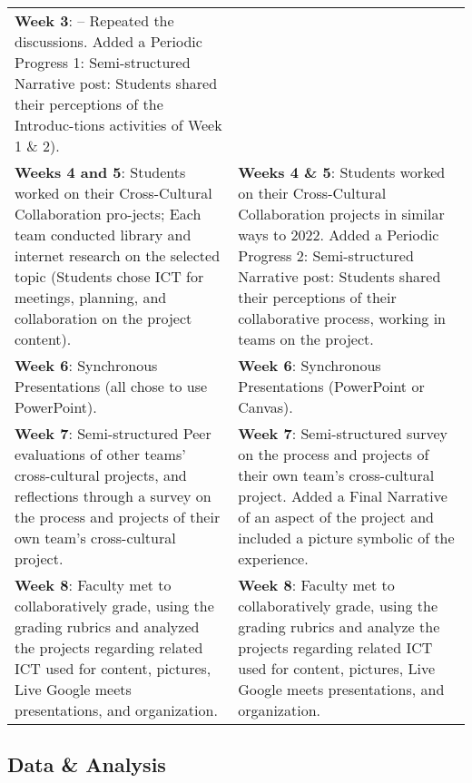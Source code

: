 \begin{table}[htpb]
\begin{threeparttable}
\begin{tabular}{*{2}{p{}}}
\textbf{Week 3}: – Repeated the discussions.
Added a Periodic Progress 1: Semi-structured Narrative post: Students shared their perceptions of the Introduc-tions activities of Week 1 \& 2). \\
										
\textbf{Weeks 4 and 5}: Students worked on their Cross-Cultural Collaboration pro-jects; Each team conducted library and internet research on the selected topic (Students chose ICT for meetings, planning, and collaboration on the project content). & 
					
\textbf{Weeks 4 \& 5}: Students worked on their Cross-Cultural Collaboration projects in similar ways to 2022.  
Added a Periodic Progress 2: Semi-structured Narrative post: Students shared their perceptions of their collaborative process, working in teams on the project. \\
					
\textbf{Week 6}: Synchronous Presentations (all chose to use PowerPoint). &
									
\textbf{Week 6}: Synchronous Presentations (PowerPoint or Canvas). \\
					
\textbf{Week 7}: Semi-structured Peer evaluations of other teams' cross-cultural projects, and reflections through a survey on the process and projects of their own team's cross-cultural project. &
					
\textbf{Week 7}: Semi-structured survey on the process and projects of their own team's cross-cultural project.
Added a Final Narrative of an aspect of the project and included a picture symbolic of the experience. \\
					
\textbf{Week 8}: Faculty met to collaboratively grade, using the grading rubrics and analyzed the projects regarding related ICT used for content, pictures, Live Google meets presentations, and organization. &
					
\textbf{Week 8}: Faculty met to collaboratively grade, using the grading rubrics and analyze the projects regarding related ICT used for content, pictures, Live Google meets presentations, and organization.\\
\bottomrule
\end{tabular}
\end{threeparttable}
\end{table}

		
\subsection{Data \& Analysis}\label{sub-sec-dataandanalysis}
		
